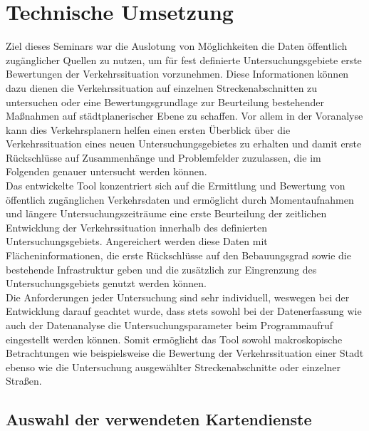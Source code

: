 \section{Technische Umsetzung}
\label{sec:technische_umsetzung}

Ziel dieses Seminars war die Auslotung von Möglichkeiten die Daten öffentlich zugänglicher Quellen zu nutzen, um für fest definierte Untersuchungsgebiete erste Bewertungen der Verkehrssituation vorzunehmen. Diese Informationen können dazu dienen die Verkehrssituation auf einzelnen Streckenabschnitten zu untersuchen oder eine Bewertungsgrundlage zur Beurteilung bestehender Maßnahmen auf städtplanerischer Ebene zu schaffen. Vor allem in der Voranalyse kann dies Verkehrsplanern helfen einen ersten Überblick über die Verkehrssituation eines neuen Untersuchungsgebietes zu erhalten und damit erste Rückschlüsse auf Zusammenhänge und Problemfelder zuzulassen, die im Folgenden genauer untersucht werden können.\\

Das entwickelte Tool konzentriert sich auf die Ermittlung und Bewertung von öffentlich zugänglichen Verkehrsdaten und ermöglicht durch Momentaufnahmen und längere Untersuchungszeiträume eine erste Beurteilung der zeitlichen Entwicklung der Verkehrssituation innerhalb des definierten Untersuchungsgebiets. Angereichert werden diese Daten mit Flächeninformationen, die erste Rückschlüsse auf den Bebauungsgrad sowie die bestehende Infrastruktur geben und die zusätzlich zur Eingrenzung des Untersuchungsgebiets genutzt werden können.\\

Die Anforderungen jeder Untersuchung sind sehr individuell, weswegen bei der Entwicklung darauf geachtet wurde, dass stets sowohl bei der Datenerfassung wie auch der Datenanalyse die Untersuchungsparameter beim Programmaufruf eingestellt werden können. Somit ermöglicht das Tool sowohl makroskopische Betrachtungen wie beispielsweise die Bewertung der Verkehrssituation einer Stadt ebenso wie die Untersuchung ausgewählter Streckenabschnitte oder einzelner Straßen.

\subsection{Auswahl der verwendeten Kartendienste}
\label{sec:kartendienste}

